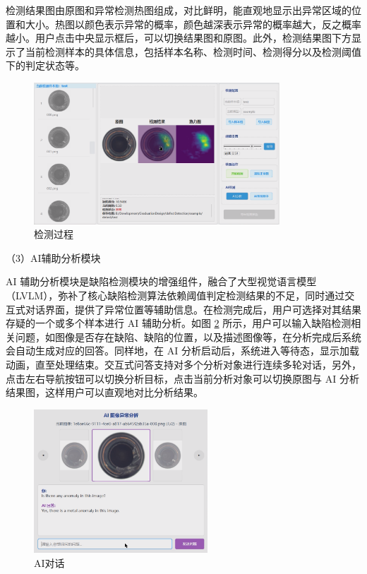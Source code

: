\documentclass[
  ]{njuthesis}
\begin{document}
检测结果图由原图和异常检测热图组成，对比鲜明，能直观地显示出异常区域的位置和大小。热图以颜色表示异常的概率，颜色越深表示异常的概率越大，反之概率越小。用户点击中央显示框后，可以切换结果图和原图。此外，检测结果图下方显示了当前检测样本的具体信息，包括样本名称、检测时间、检测得分以及检测阈值下的判定状态等。

\begin{figure}[htb]
    \centering
    \includegraphics[width=0.82\textwidth]{images/检测过程.png}
    \caption{检测过程}
    \label{检测过程}
\end{figure}

（3）AI辅助分析模块

AI 辅助分析模块是缺陷检测模块的增强组件，融合了大型视觉语言模型（LVLM），弥补了核心缺陷检测算法依赖阈值判定检测结果的不足，同时通过交互式对话界面，提供了异常位置等辅助信息。在检测完成后，用户可选择对其结果存疑的一个或多个样本进行 AI 辅助分析。如图 \ref{AI对话} 所示，用户可以输入缺陷检测相关问题，如图像是否存在缺陷、缺陷的位置，以及描述图像等，在分析完成后系统会自动生成对应的回答。同样地，在 AI 分析启动后，系统进入等待态，显示加载动画，直至处理结束。交互式问答支持对多个分析对象进行连续多轮对话，另外，点击左右导航按钮可以切换分析目标，点击当前分析对象可以切换原图与 AI 分析结果图，这样用户可以直观地对比分析结果。

\begin{figure}[H]
    \centering
    \includegraphics[width=0.58\textwidth]{images/AI对话.png}
    \caption{AI对话}
    \label{AI对话}
\end{figure}
\end{document}
